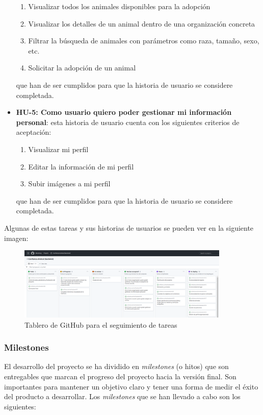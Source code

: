 \begin{itemize}
\begin{enumerate}
            \item Visualizar todos los animales disponibles para la adopción
            \item Visualizar los detalles de un animal dentro de una organización concreta
            \item Filtrar la búsqueda de animales con parámetros como raza, tamaño, sexo, etc.
            \item Solicitar la adopción de un animal
        \end{enumerate}
    que han de ser cumplidos para que la historia de usuario se considere completada.
    \item \textbf{HU-5: Como usuario quiero poder gestionar mi información personal}: esta historia de usuario cuenta
    con los siguientes criterios de aceptación:
        \begin{enumerate}
            \item Visualizar mi perfil
            \item Editar la información de mi perfil
            \item Subir imágenes a mi perfil
        \end{enumerate}
    que han de ser cumplidos para que la historia de usuario se considere completada.
\end{itemize}

Algunas de estas tareas y sus historias de usuarios se pueden ver en la siguiente imagen:

\begin{figure}[H]
    \centering
    \includegraphics[width=0.9\textwidth]{imgs/tablero-github.png}
    \caption{Tablero de GitHub para el seguimiento de tareas}
    \label{fig:tablero-github}
\end{figure}

\subsubsection{Milestones}

El desarrollo del proyecto se ha dividido en \textit{milestones} (o hitos) que son entregables que marcan
el progreso del proyecto hacia la versión final. Son importantes para mantener un objetivo claro y tener una
forma de medir el éxito del producto a desarrollar. Los \textit{milestones} que se han llevado a cabo son los
siguientes:

